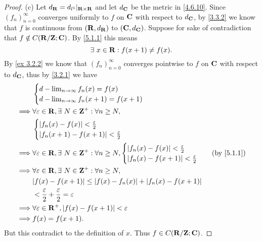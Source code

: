 \begin{proof}{(c)}
  Let \(d_{\mathbf{R}} = d_{l^1}|_{\mathbf{R} \times \mathbf{R}}\) and let \(d_{\mathbf{C}}\) be the metric in \cref{4.6.10}.
  Since \((f_n)_{n = 0}^\infty\) converges uniformly to \(f\) on \(\mathbf{C}\) with respect to \(d_{\mathbf{C}}\), by \cref{3.3.2} we know that \(f\) is continuous from \((\mathbf{R}, d_{\mathbf{R}})\) to \((\mathbf{C}, d_{\mathbf{C}})\).
  Suppose for sake of contradiction that \(f \notin C(\mathbf{R} / \mathbf{Z} ; \mathbf{C})\).
  By \cref{5.1.1} this means
  \[
    \exists\ x \in \mathbf{R} : f(x + 1) \neq f(x).
  \]
  By \cref{ex 3.2.2} we know that \((f_n)_{n = 0}^\infty\) converges pointwise to \(f\) on \(\mathbf{C}\) with respect to \(d_{\mathbf{C}}\), thus by \cref{3.2.1} we have
  \begin{align*}
             & \begin{cases}
                 d - \lim_{n \to \infty} f_n(x) = f(x) \\
                 d - \lim_{n \to \infty} f_n(x + 1) = f(x + 1)
               \end{cases}                                                                       \\
    \implies & \forall \varepsilon \in \R, \exists\ N \in \Z^+ : \forall n \geq N,                                                \\
             & \begin{cases}
                 \abs{f_n(x) - f(x)} < \frac{\varepsilon}{2} \\
                 \abs{f_n(x + 1) - f(x + 1)} < \frac{\varepsilon}{2}
               \end{cases}                                                                 \\
    \implies & \forall \varepsilon \in \R, \exists\ N \in \Z^+ : \forall n \geq N, \begin{cases}
                                                                                     \abs{f_n(x) - f(x)} < \frac{\varepsilon}{2} \\
                                                                                     \abs{f_n(x) - f(x + 1)} < \frac{\varepsilon}{2}
                                                                                   \end{cases} & \text{(by \cref{5.1.1})} \\
    \implies & \forall \varepsilon \in \R, \exists\ N \in \Z^+ : \forall n \geq N,                                                \\
             & \abs{f(x) - f(x + 1)} \leq \abs{f(x) - f_n(x)} + \abs{f_n(x) - f(x + 1)}                                           \\
             & < \frac{\varepsilon}{2} + \frac{\varepsilon}{2} = \varepsilon                                                      \\
    \implies & \forall \varepsilon \in \R^+, \abs{f(x) - f(x + 1)} < \varepsilon                                                  \\
    \implies & f(x) = f(x + 1).
  \end{align*}
  But this contradict to the definition of \(x\).
  Thus \(f \in C(\mathbf{R} / \mathbf{Z} ; \mathbf{C})\).
\end{proof}

